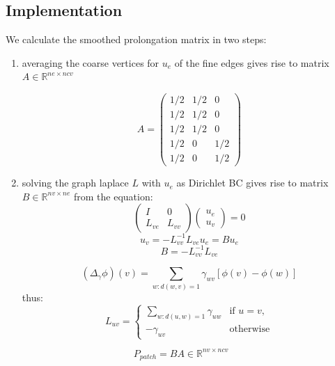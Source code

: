\documentclass[a4paper,11pt]{scrartcl}
\newcommand{\R}{\mathbb{R}}
\begin{document}
\subsection{Implementation}
We calculate the smoothed prolongation matrix in two steps:
\begin{enumerate}
  \item averaging the coarse vertices for $u_e$ of the fine edges gives rise to matrix
    $A \in \R^{ne \times ncv}$

    \begin{equation*}
      A =
      \begin{pmatrix}
        1/2 & 1/2 &  0 \\
        1/2 & 1/2 &  0 \\
        1/2 & 1/2 &  0 \\
        1/2 &  0  & 1/2 \\
        1/2 &  0  & 1/2
      \end{pmatrix}
    \end{equation*}


  \item solving the graph laplace $L$ with $u_e$ as Dirichlet BC gives rise to matrix
    $B \in \R^{nv \times ne}$
    from the equation:
    \begin{equation*}
      \begin{pmatrix}
        I & 0 \\
        L_{ve} & L_{vv}
      \end{pmatrix}
      \begin{pmatrix}
        u_e \\
        u_v
      \end{pmatrix}
      = 0
    \end{equation*}
    \[ u_v = - L^{-1}_{vv} L_{ve} u_e = B u_e \]
    \[ B = - L^{-1}_{vv} L_{ve} \]

    \[ (\Delta_{\gamma} \phi)(v) = \sum_{w: d(w,v)=1} \gamma_{wv}[\phi(v) - \phi(w)] \]
    thus:
    \begin{equation*}
      L_{uv} =
      \begin{cases}
        \sum_{w: d(u,w)=1} \gamma_{uw} & \text{if } u=v,\\
        -\gamma_{uv}& \text{otherwise}
      \end{cases}
    \end{equation*}

\end{enumerate}

\[ P_{patch} = B A \in \R^{nv \times ncv} \]
\end{document}
